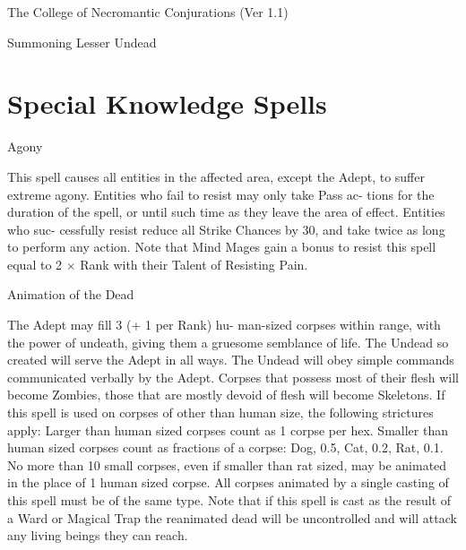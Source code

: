 \begin{Chapter}{The College of Necromantic Conjurations (Ver 1.1)}
\begin{ritual}[Q-2]{Summoning Lesser Undead }
\begin{effects}
\end{effects}
\end{ritual}

\section{Special Knowledge Spells}

\begin{spell}[S-1]{Agony }

\begin{effects}
This spell causes all entities in the affected 
area,  except  the  Adept,  to  suffer  extreme  agony. 
Entities  who  fail  to  resist  may  only  take  Pass  ac-
tions for the duration of the spell, or until such time 
as  they  leave  the  area  of  effect.  Entities  who  suc-
cessfully  resist  reduce  all  Strike  Chances  by  30, 
and take twice as long to perform any action. Note 
that  Mind  Mages  gain  a  bonus  to  resist  this  spell 
equal  to  2  ×  Rank  with  their  Talent  of  Resisting 
Pain. 

\end{effects}
\end{spell}

\begin{spell}[S-2]{Animation of the Dead }

\begin{effects}
 The  Adept  may  fill  3  (+  1  per  Rank)  hu-
man-sized corpses within range, with the power of 
undeath,  giving  them  a  gruesome  semblance  of 
life. The Undead so created will serve the Adept in 
all ways. The Undead will obey simple commands 
communicated verbally by the Adept. Corpses that 
possess  most  of  their  flesh  will  become  Zombies, 
those  that  are  mostly  devoid  of  flesh  will  become 
Skeletons.  If  this  spell  is  used  on  corpses  of  other 
than  human  size,  the  following  strictures  apply: 
Larger than human sized corpses count as 1 corpse 
per hex. Smaller than human sized corpses count as 
fractions  of  a  corpse:  Dog,  0.5,  Cat,  0.2,  Rat,  0.1. 
No  more  than  10  small  corpses,  even  if  smaller 
than  rat  sized,  may  be  animated  in  the  place  of  1 
human  sized  corpse.  All  corpses  animated  by  a 
single  casting  of  this  spell  must  be  of  the  same 
type. Note that if this spell is cast as the result of a 
Ward or Magical Trap the reanimated dead will be 
uncontrolled and will attack any living beings they 
can reach. 


\end{effects}
\end{spell}
\end{Chapter}
